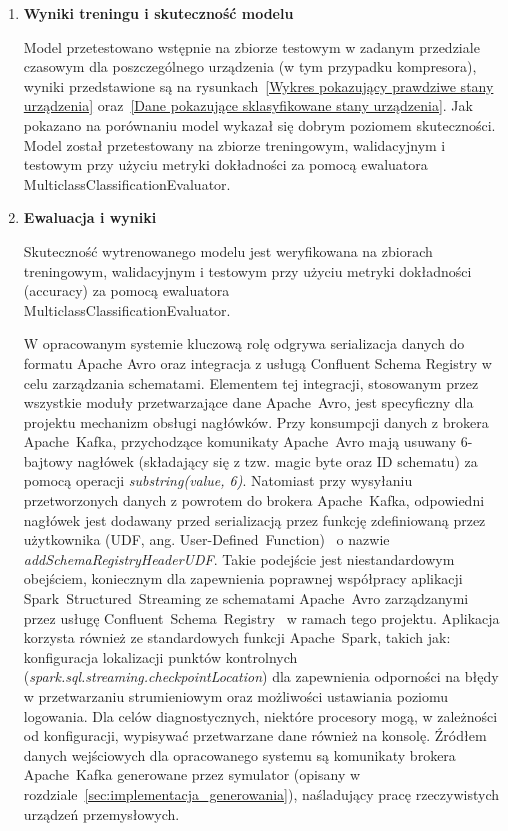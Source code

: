 \begin{enumerate}
    \item \textbf{Wyniki treningu i skuteczność modelu}

Model przetestowano wstępnie na zbiorze testowym w zadanym przedziale czasowym dla poszczególnego urządzenia (w tym przypadku kompresora), wyniki przedstawione są na rysunkach~\ref{Wykres pokazujący prawdziwe stany urządzenia} oraz~\ref{Dane pokazujące sklasyfikowane stany urządzenia}. Jak pokazano na porównaniu model wykazał się dobrym poziomem skuteczności. Model został przetestowany na zbiorze treningowym, walidacyjnym i testowym przy użyciu metryki dokładności za pomocą ewaluatora MulticlassClassificationEvaluator. 


\label{fig:prawdziwe_stany}

\label{fig:sklasyfikowane_stany}

    \item \textbf{Ewaluacja i wyniki}

Skuteczność wytrenowanego modelu jest weryfikowana na zbiorach treningowym, walidacyjnym i testowym przy użyciu metryki dokładności (accuracy) za pomocą ewaluatora \\ MulticlassClassificationEvaluator.

W opracowanym systemie kluczową rolę odgrywa serializacja danych do formatu Apache Avro oraz integracja z usługą Confluent Schema Registry w celu zarządzania schematami. Elementem tej integracji, stosowanym przez wszystkie moduły przetwarzające dane \mbox{Apache Avro}, jest specyficzny dla projektu mechanizm obsługi nagłówków. Przy konsumpcji danych z brokera \mbox{Apache Kafka}, przychodzące komunikaty \mbox{Apache Avro} mają usuwany 6-bajtowy nagłówek (składający się z tzw. magic byte oraz ID schematu) za pomocą operacji \textit{substring(value, 6)}. Natomiast przy wysyłaniu przetworzonych danych z powrotem do brokera \mbox{Apache Kafka}, odpowiedni nagłówek jest dodawany przed serializacją przez funkcję zdefiniowaną przez użytkownika (UDF, ang. \mbox{User-Defined Function})~\cite{spark_udf} o nazwie \textit{addSchemaRegistryHeaderUDF}. Takie podejście jest niestandardowym obejściem, koniecznym dla zapewnienia poprawnej współpracy aplikacji \mbox{Spark Structured Streaming} ze schematami \mbox{Apache Avro} zarządzanymi przez usługę \mbox{Confluent Schema Registry}~\cite{confluent_schema_registry} w ramach tego projektu. Aplikacja korzysta również ze standardowych funkcji \mbox{Apache Spark}, takich jak: konfiguracja lokalizacji punktów kontrolnych (\textit{\mbox{spark.sql.streaming.checkpointLocation}}) dla zapewnienia odporności na błędy w przetwarzaniu strumieniowym oraz możliwości ustawiania poziomu logowania. Dla celów diagnostycznych, niektóre procesory mogą, w zależności od konfiguracji, wypisywać przetwarzane dane również na konsolę. Źródłem danych wejściowych dla opracowanego systemu są komunikaty brokera \mbox{Apache Kafka} generowane przez symulator (opisany w rozdziale~\ref{sec:implementacja_generowania}), naśladujący pracę rzeczywistych urządzeń przemysłowych.

\end{enumerate}